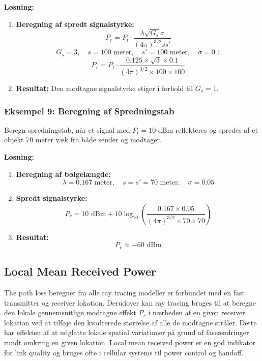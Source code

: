 \documentclass[a4paper,12pt]{book}
\begin{document}
	\noindent \textbf{Løsning:}
	\begin{enumerate}
		\item \textbf{Beregning af spredt signalstyrke:} 
		\[
		P_r = P_t \cdot \frac{\lambda \sqrt{G_s} \sigma}{(4\pi)^{3/2}ss'}
		\]
		\[
		G_s = 3, \quad s = 100 \text{ meter}, \quad s' = 100 \text{ meter}, \quad \sigma = 0.1
		\]
		\[
		P_r = P_t \cdot \frac{0.125 \times \sqrt{3} \times 0.1}{(4\pi)^{3/2} \times 100 \times 100}
		\]
		\item \textbf{Resultat:} Den modtagne signalstyrke stiger i forhold til \( G_s = 1 \).
	\end{enumerate}
	
	\subsubsection{Eksempel 9: Beregning af Spredningstab}
	\noindent Beregn spredningstab, når et signal med \( P_t = 10 \) dBm reflekteres og spredes af et objekt 70 meter væk fra både sender og modtager.
	
	\noindent \textbf{Løsning:}
	\begin{enumerate}
		\item \textbf{Beregning af bølgelængde:}
		\[
		\lambda = 0.167 \text{ meter}, \quad s = s' = 70 \text{ meter}, \quad \sigma = 0.05
		\]
		\item \textbf{Spredt signalstyrke:}
		\[
		P_r = 10 \text{ dBm} + 10 \log_{10}\left( \frac{0.167 \times 0.05}{(4\pi)^{3/2} \times 70 \times 70} \right)
		\]
		\item \textbf{Resultat:} 
		\[
		P_r \approx -60 \text{ dBm}
		\]
	\end{enumerate}

	\subsection{Local Mean Received Power}
	The path loss beregnet fra alle ray tracing modeller er forbundet med en fast transmitter og receiver lokation. Derudover kan ray tracing bruges til at beregne den lokale gennemsnitlige
	modtagne effekt \( P_r \) i nærheden af en given receiver lokation ved at tilføje den kvadrerede størrelse af alle de modtagne stråler. Dette har effekten af at udglatte lokale spatial variationer på grund af faseændringer rundt omkring en given lokation. Local mean received power er en god indikator for link quality og bruges ofte i cellular systems til power control og handoff.
	
\end{document}
